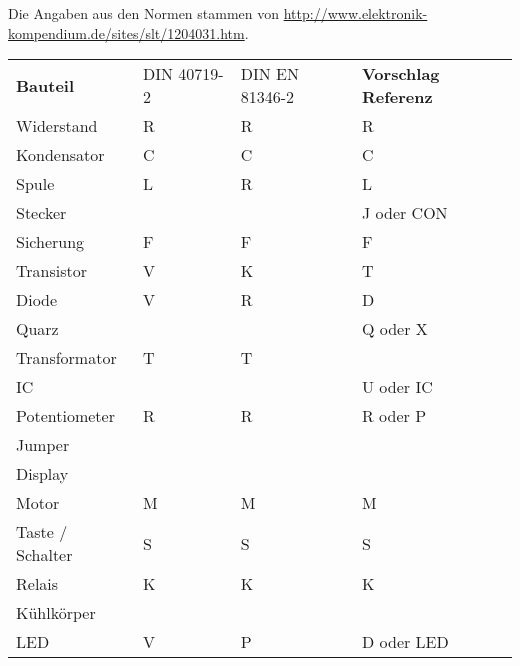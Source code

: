 Die Angaben aus den Normen stammen von 
\url{http://www.elektronik-kompendium.de/sites/slt/1204031.htm}. 
\begin{table}[h!]
  \begin{tabular}{llll}
  \rowcolor{white}  \textbf{Bauteil} 	  & DIN 40719-2   & DIN EN 81346-2    & \textbf{Vorschlag Referenz}\\
  \rowcolor{lgray}  Widerstand            & R             & R                 & R \\
  \rowcolor{white}  Kondensator           & C             & C                 & C \\
  \rowcolor{lgray}  Spule                 & L             & R                 & L \\
  \rowcolor{white}  Stecker               &               &                   & J oder CON \\
  \rowcolor{lgray}  Sicherung             & F             & F                 & F \\
  \rowcolor{white}  Transistor            & V             & K                 & T \\
  \rowcolor{lgray}  Diode                 & V             & R                 & D \\
  \rowcolor{white}  Quarz                 &               &                   & Q oder X \\
  \rowcolor{lgray}  Transformator         & T             & T                 &  \\
  \rowcolor{white}  IC                    &               &                   & U oder IC \\
  \rowcolor{lgray}  Potentiometer         & R             & R                 & R oder P \\
  \rowcolor{white}  Jumper                &               &                   &  \\
  \rowcolor{lgray}  Display               &               &                   &  \\
  \rowcolor{white}  Motor                 & M             & M                 & M \\
  \rowcolor{lgray}  Taste / Schalter      & S             & S                 & S \\
  \rowcolor{white}  Relais                & K             & K                 & K \\
  \rowcolor{lgray}  Kühlkörper            &               &                   &  \\
  \rowcolor{white}  LED                   & V             & P                 & D oder LED \\

\end{tabular}
\end{table}
